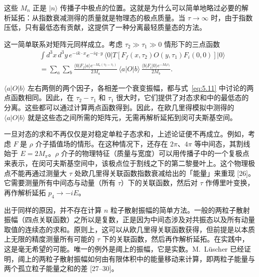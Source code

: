这些 $M_n$ 正是 $|n\rangle$ 传播子中极点的位置。这就是为什么可以简单地略过必要的解析延拓：从指数衰减测得的质量就是物理态的极点质量。当 $\tau \to \infty$ 时，由于指数压低，只有最低态有贡献，这提供了一种分离最轻质量态的方法。

这一简单联系对矩阵元同样成立。考虑 $\tau_2 \gg \tau_1 \gg 0$ 情形下的三点函数
\begin{equation}
\begin{aligned}
&\int d^3x\, d^3y\, e^{-ik\cdot x} e^{-iq\cdot y}\, \langle 0| T[F_f(x,\tau_2) O(y,\tau_1) F_i(0,0)] |0\rangle \\
&= \sum_a \sum_b \frac{\langle 0|F_f|a\rangle e^{-M_a (\tau_2 - \tau_1)}}{2M_a}\, \langle a|O|b\rangle\, \frac{\langle b|F_i|0\rangle e^{-M_b \tau_1}}{2M_b} .
\end{aligned}
\label{eq:5.13}
\end{equation}

$\langle a|O|b\rangle$ 左右两侧的两个因子，各相差一个衰变振幅，都与式~\eqref{eq:5.11} 中讨论的两点函数相同。因此，在 $\tau_2 - \tau_1$ 和 $\tau_1$ 很大时，它们提供了对态求和中的最低态的分离。这些都可以通过计算两点函数得到。因此，在欧几里得模拟中测得的 $\langle a|O|b\rangle$ 就是这些态之间所需的矩阵元，无需再解析延拓到闵可夫斯基空间。

一旦对态的求和不再仅仅是对稳定单粒子态求和，上述论证便不再成立。例如，考虑 $F$ 是 $\rho$ 介子插值场的情形。在这种情况下，还存在 $2\pi$、$4\pi$ 等中间态，其割线始于 $E = 2M_\pi$。$\rho$ 介子的物理特征（质量与宽度）可以用传播子中的一个复极点来表示，在闵可夫斯基空间中，该极点位于割线之下的第二黎曼叶上。这个物理极点不能再通过测量大 $\tau$ 处欧几里得关联函数指数衰减给出的「能量」来重现 [26]。它需要测量所有中间态与动量（所有 $\tau$）下的关联函数，然后对 $\tau$ 作傅里叶变换，再作解析延拓 $p_4 \to -iE$。

出于同样的原因，并不存在计算 $n$ 粒子散射振幅的简单方法。一般的两粒子散射振幅（四点关联函数）之所以是复数，正是因为中间态涉及对共振态以及所有动量取值的连续态的求和。原则上，这可以从欧几里得关联函数获得，但前提是以本质上无限的精度测量所有可能的 $\tau$ 下的关联函数，然后再作解析延拓。在实践中，这是毫无希望的可能。唯一的例外是阈上的振幅，它是实数。M.~L\"uscher 已经证明，阈上的两粒子散射振幅如何由有限体积中的能量移动来计算，即两粒子能量与两个孤立粒子能量之和的差 [27--30]。
